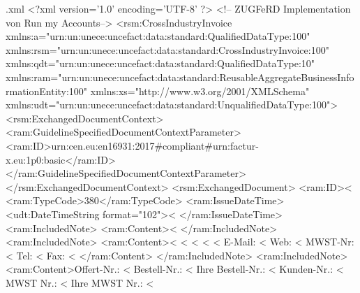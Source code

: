 
\begin{filecontents*}{\jobname.xml}
<?xml version='1.0' encoding='UTF-8' ?>
<!-- ZUGFeRD Implementation von Run my Accounts-->
<rsm:CrossIndustryInvoice xmlns:a="urn:un:unece:uncefact:data:standard:QualifiedDataType:100" xmlns:rsm="urn:un:unece:uncefact:data:standard:CrossIndustryInvoice:100" xmlns:qdt="urn:un:unece:uncefact:data:standard:QualifiedDataType:10" xmlns:ram="urn:un:unece:uncefact:data:standard:ReusableAggregateBusinessInformationEntity:100" xmlns:xs="http://www.w3.org/2001/XMLSchema" xmlns:udt="urn:un:unece:uncefact:data:standard:UnqualifiedDataType:100">
  <rsm:ExchangedDocumentContext>
    <ram:GuidelineSpecifiedDocumentContextParameter>
      <ram:ID>urn:cen.eu:en16931:2017#compliant#urn:factur-x.eu:1p0:basic</ram:ID>
    </ram:GuidelineSpecifiedDocumentContextParameter>
  </rsm:ExchangedDocumentContext>
  <rsm:ExchangedDocument>
    <ram:ID><%
    <ram:TypeCode>380</ram:TypeCode>
    <ram:IssueDateTime>
      <udt:DateTimeString format="102"><%
    </ram:IssueDateTime>
    <ram:IncludedNote>
      <ram:Content><%
    </ram:IncludedNote>
    <ram:IncludedNote>
      <ram:Content><%
<%
<%
<%
<%
E-Mail: <%
Web: <%
MWST-Nr: <%
Tel: <%
Fax: <%
      </ram:Content>
    </ram:IncludedNote>
    <ram:IncludedNote>
      <ram:Content>Offert-Nr.: <%
Bestell-Nr.: <%
Ihre Bestell-Nr.: <%
Kunden-Nr.: <%
MWST Nr.: <%
Ihre MWST Nr.: <%


\end{filecontents*}
